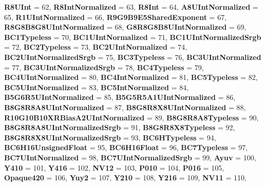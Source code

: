 \begin{DoxyCompactItemize}
{\bfseries R8\+U\+Int} = 62, 
\newline
{\bfseries R8\+Int\+Normalized} = 63, 
{\bfseries R8\+Int} = 64, 
{\bfseries A8\+U\+Int\+Normalized} = 65, 
{\bfseries R1\+U\+Int\+Normalized} = 66, 
\newline
{\bfseries R9\+G9\+B9\+E5\+Shared\+Exponent} = 67, 
{\bfseries R8\+G8\+B8\+G8\+U\+Int\+Normalized} = 68, 
{\bfseries G8\+R8\+G8\+B8\+U\+Int\+Normalized} = 69, 
{\bfseries B\+C1\+Typeless} = 70, 
\newline
{\bfseries B\+C1\+U\+Int\+Normalized} = 71, 
{\bfseries B\+C1\+U\+Int\+Normalized\+Srgb} = 72, 
{\bfseries B\+C2\+Typeless} = 73, 
{\bfseries B\+C2\+U\+Int\+Normalized} = 74, 
\newline
{\bfseries B\+C2\+U\+Int\+Normalized\+Srgb} = 75, 
{\bfseries B\+C3\+Typeless} = 76, 
{\bfseries B\+C3\+U\+Int\+Normalized} = 77, 
{\bfseries B\+C3\+U\+Int\+Normalized\+Srgb} = 78, 
\newline
{\bfseries B\+C4\+Typeless} = 79, 
{\bfseries B\+C4\+U\+Int\+Normalized} = 80, 
{\bfseries B\+C4\+Int\+Normalized} = 81, 
{\bfseries B\+C5\+Typeless} = 82, 
\newline
{\bfseries B\+C5\+U\+Int\+Normalized} = 83, 
{\bfseries B\+C5\+Int\+Normalized} = 84, 
{\bfseries B5\+G6\+R5\+U\+Int\+Normalized} = 85, 
{\bfseries B5\+G5\+R5\+A1\+U\+Int\+Normalized} = 86, 
\newline
{\bfseries B8\+G8\+R8\+A8\+U\+Int\+Normalized} = 87, 
{\bfseries B8\+G8\+R8\+X8\+U\+Int\+Normalized} = 88, 
{\bfseries R10\+G10\+B10\+X\+R\+Bias\+A2\+U\+Int\+Normalized} = 89, 
{\bfseries B8\+G8\+R8\+A8\+Typeless} = 90, 
\newline
{\bfseries B8\+G8\+R8\+A8\+U\+Int\+Normalized\+Srgb} = 91, 
{\bfseries B8\+G8\+R8\+X8\+Typeless} = 92, 
{\bfseries B8\+G8\+R8\+X8\+U\+Int\+Normalized\+Srgb} = 93, 
{\bfseries B\+C6\+H\+Typeless} = 94, 
\newline
{\bfseries B\+C6\+H16\+Unsigned\+Float} = 95, 
{\bfseries B\+C6\+H16\+Float} = 96, 
{\bfseries B\+C7\+Typeless} = 97, 
{\bfseries B\+C7\+U\+Int\+Normalized} = 98, 
\newline
{\bfseries B\+C7\+U\+Int\+Normalized\+Srgb} = 99, 
{\bfseries Ayuv} = 100, 
{\bfseries Y410} = 101, 
{\bfseries Y416} = 102, 
\newline
{\bfseries N\+V12} = 103, 
{\bfseries P010} = 104, 
{\bfseries P016} = 105, 
{\bfseries Opaque420} = 106, 
\newline
{\bfseries Yuy2} = 107, 
{\bfseries Y210} = 108, 
{\bfseries Y216} = 109, 
{\bfseries N\+V11} = 110, 
\newline

\end{DoxyCompactItemize}
